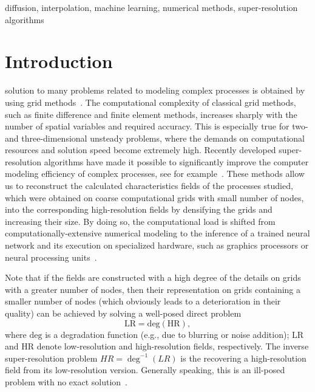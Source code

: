 \documentclass{ieeeaccess}
\begin{document}
\begin{keywords}
diffusion, interpolation, machine learning, numerical methods,  super-resolution algorithms
\end{keywords}

\titlepgskip=-15pt

\maketitle

\section{Introduction}
\label{sec:introduction}
 solution to many problems related to modeling complex processes is obtained by using grid methods~\cite{Tikhonov_EMP}. The computational complexity of classical grid methods, such as finite difference and finite element methods, increases sharply with the number of spatial variables and required accuracy. This is especially true for two- and three-dimensional unsteady problems, where the demands on computational resources and solution speed become extremely high. Recently developed super-resolution algorithms have made it possible to significantly improve the computer modeling efficiency  of complex processes, see for example~\cite{Pathak_SR_CFD, Fukami_SR_CFD, Xie_SR_FF}. These methods allow us to reconstruct the calculated characteristics fields of the processes studied, which were obtained on coarse computational grids with small number of nodes, into the corresponding high-resolution fields by densifying the grids and increasing their size. By doing so, the computational load is shifted from computationally-extensive numerical modeling to the inference of a trained neural network and its execution on specialized hardware, such as graphics processors or neural processing units~\cite{Wang_SR_srv}.

Note that if the fields are constructed with a high degree of the details on grids with a greater number of nodes, then their representation on grids containing a smaller number of nodes (which obviously leads to a deterioration in their quality) can be achieved by solving a well-posed direct problem
%
\begin{equation} \label{eq:degradation}
\mathrm{LR} = \mathrm{deg}(\mathrm{HR}),
\end{equation}
%
where $\mathrm{deg}$ is a degradation function (e.g., due to blurring or noise addition);  $\mathrm{LR}$ and $\mathrm{HR}$ denote low-resolution and high-resolution fields, respectively. The inverse super-resolution problem 
$HR = {\deg ^{ - 1}}(LR)$ is the recovering a high-resolution field from its low-resolution version. Generally speaking, this is an ill-posed problem with no exact solution~\cite{Yang_DL_SR}.
\end{document}
